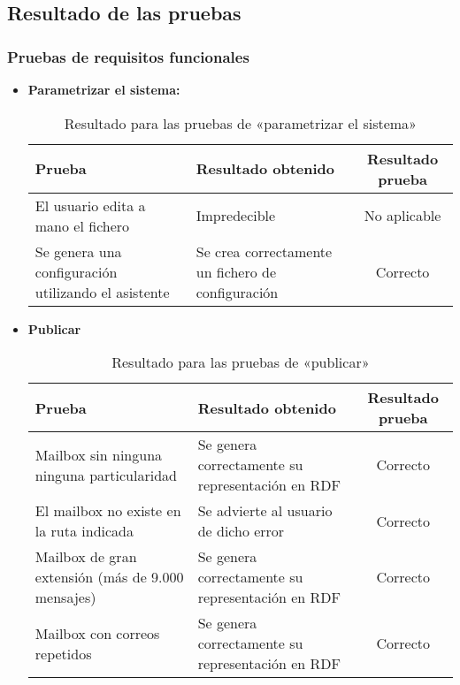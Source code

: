 
\subsection{Resultado de las pruebas}

\subsubsection{Pruebas de requisitos funcionales}

\begin{itemize}

  \item \textbf{Parametrizar el sistema:}
	\begin{table}[H]
	\begin{center}
	\begin{tabular}{|p{4cm}|p{6cm}|c|}
		\hline
		\textbf{Prueba} & \textbf{Resultado obtenido} & \textbf{Resultado prueba} \\ 
		\hline
		El usuario edita a mano el fichero 
		& 
		Impredecible
		&
		No aplicable
		\\\hline
		Se genera una configuración utilizando el asistente
		& 
		Se crea correctamente un fichero de configuración
		&
		Correcto
		\\\hline
	\end{tabular}
	\caption{Resultado para las pruebas de «parametrizar el sistema»}
	\end{center}
	\end{table}

  \item \textbf{Publicar}
	\begin{table}[H]
	 \begin{center}
	  \begin{tabular}{|p{4cm}|p{6cm}|c|}
		\hline
		\textbf{Prueba} & \textbf{Resultado obtenido} & \textbf{Resultado prueba} \\ 
		\hline
		Mailbox sin ninguna ninguna particularidad 
		& 
		Se genera correctamente su representación en RDF
		&
		Correcto
		\\\hline
		El mailbox no existe en la ruta indicada 
		& 
		Se advierte al usuario de dicho error
		&
		Correcto
		\\\hline
		Mailbox de gran extensión (más de 9.000 mensajes)
		& 
		Se genera correctamente su representación en RDF
		&
		Correcto
		\\\hline
		Mailbox con correos repetidos
		& 
		Se genera correctamente su representación en RDF
		&
		Correcto
		\\\hline
	  \end{tabular}
	  \caption{Resultado para las pruebas de «publicar»}
	 \end{center}
	\end{table}


\end{itemize}
